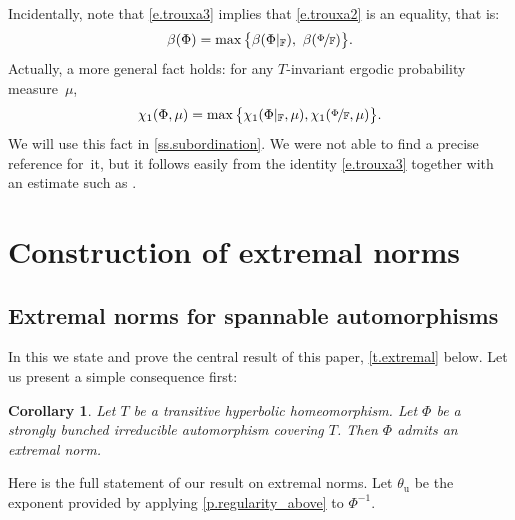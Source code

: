 \documentclass[10pt]{amsart}
\theoremstyle{plain}
\newtheorem{corollary}[theorem]{Corollary}
\theoremstyle{definition}
\newcommand{\FF}{\mathbb{F}}
\newcommand{\uu}{\mathrm{u}}
\begin{document}
Incidentally, note that \eqref{e.trouxa3} implies that \eqref{e.trouxa2} is an equality, that is:
\begin{equation}\label{e.split_beta}
\beta(\Phi) = \max \big\{ \beta(\Phi|_\FF), \ \beta(\nicefrac{\Phi}{\FF}) \big\}.
\end{equation}
Actually, a more general fact holds: for any $T$-invariant ergodic probability measure~$\mu$,%
\begin{equation}\label{e.split_chi}
\chi_1(\Phi, \mu) = \max \big\{ \chi_1(\Phi|_{\FF}, \mu), \chi_1(\nicefrac{\Phi}{\FF}, \mu) \big\}.
\end{equation}
We will use this fact in \cref{ss.subordination}.
We were not able to find a precise reference for~it, but it follows easily from the identity \eqref{e.trouxa3} together with an estimate such as \hbox{\cite[Lem.\,12]{B_Oseledets}}.

\section{Construction of extremal norms}\label{s.norms}

\subsection{Extremal norms for spannable automorphisms}\label{ss.extremal_norms}

In this  we state and prove the central result of this paper, \cref{t.extremal} below.
Let us present a simple consequence first:

\begin{corollary}\label{c.extremal}
Let $T$ be a transitive hyperbolic homeomorphism.
Let $\Phi$ be a strongly bunched irreducible automorphism covering $T$.
Then $\Phi$ admits an extremal norm.
\end{corollary}

Here is the full statement of our result on extremal norms.
Let $\theta_\uu$ be the exponent provided by applying \cref{p.regularity_above} to $\Phi^{-1}$.
\end{document}
